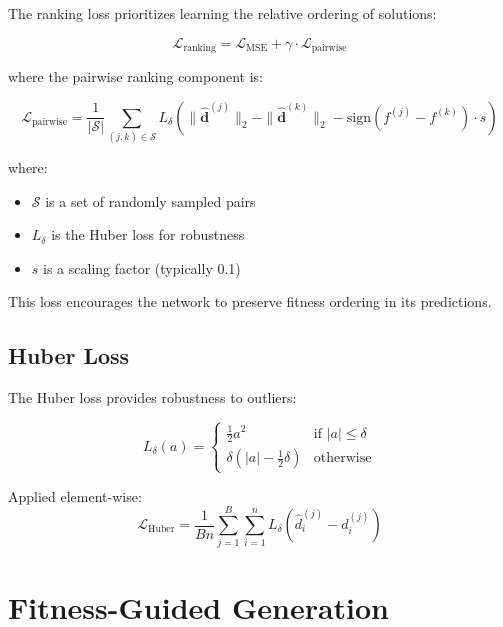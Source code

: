 \documentclass[11pt,a4paper]{article}
\begin{document}
The ranking loss prioritizes learning the relative ordering of solutions:

\begin{equation}
    \mathcal{L}_{\text{ranking}} = \mathcal{L}_{\text{MSE}} + \gamma \cdot \mathcal{L}_{\text{pairwise}}
\end{equation}

where the pairwise ranking component is:

\begin{equation}
    \mathcal{L}_{\text{pairwise}} = \frac{1}{|\mathcal{S}|} \sum_{(j,k) \in \mathcal{S}} L_\delta\left(\|\hat{\mathbf{d}}^{(j)}\|_2 - \|\hat{\mathbf{d}}^{(k)}\|_2 - \text{sign}(f^{(j)} - f^{(k)}) \cdot s\right)
\end{equation}

where:
\begin{itemize}
    \item $\mathcal{S}$ is a set of randomly sampled pairs
    \item $L_\delta$ is the Huber loss for robustness
    \item $s$ is a scaling factor (typically 0.1)
\end{itemize}

This loss encourages the network to preserve fitness ordering in its predictions.

\subsection{Huber Loss}

The Huber loss provides robustness to outliers:

\begin{equation}
    L_\delta(a) = \begin{cases}
        \frac{1}{2}a^2 & \text{if } |a| \leq \delta \\
        \delta\left(|a| - \frac{1}{2}\delta\right) & \text{otherwise}
    \end{cases}
\end{equation}

Applied element-wise:
\begin{equation}
    \mathcal{L}_{\text{Huber}} = \frac{1}{Bn}\sum_{j=1}^{B}\sum_{i=1}^{n} L_\delta\left(\hat{d}_i^{(j)} - d_i^{(j)}\right)
\end{equation}

\section{Fitness-Guided Generation}
\end{document}
